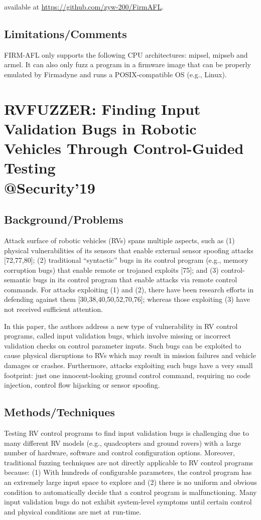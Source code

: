 available at \url{https://github.com/zyw-200/FirmAFL}.

\subsection{Limitations/Comments}
FIRM-AFL only supports the following CPU architectures: mipsel, mipseb and armel.  It can also only fuzz a program in a firmware image that can be properly emulated by Firmadyne and runs a POSIX-compatible OS (e.g., Linux).
\clearpage

\section{RVFUZZER: Finding Input Validation Bugs in Robotic Vehicles Through
Control-Guided Testing \\@Security'19}
\subsection{Background/Problems}
Attack surface of robotic vehicles (RVs) spans multiple aspects, such as (1) physical vulnerabilities of its sensors that enable external sensor spoofing attacks [72,77,80]; (2) traditional “syntactic” bugs in its control program (e.g., memory corruption bugs) that enable remote or trojaned exploits [75]; and (3) control-semantic bugs in its control program that enable attacks via remote control commands.  For attacks exploiting (1) and (2), there have been research efforts in defending against them [30,38,40,50,52,70,76]; whereas those exploiting (3) have not received sufficient attention. 

 In this paper, the authors address a new type of vulnerability in RV control programs, called input validation bugs, which involve missing or incorrect validation checks on control parameter inputs. Such bugs can be exploited to cause physical disruptions to RVs which may result in mission failures and vehicle damages or crashes. Furthermore, attacks exploiting such bugs have a very small footprint: just one innocent-looking ground control command, requiring no code injection, control flow hijacking or sensor spoofing. 
\subsection{Methods/Techniques}
Testing RV control programs to find input validation bugs is challenging due to many different RV models (e.g., quadcopters and ground rovers) with a large number of hardware, software and control configuration options. Moreover, traditional fuzzing techniques are not directly applicable to RV control programs because: (1) With hundreds of configurable parameters, the control program has an extremely large input space to explore and (2) there is no uniform and obvious condition to automatically decide that a control program is malfunctioning. Many input validation bugs do not exhibit system-level symptoms until certain control and physical conditions are met at run-time.

